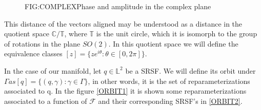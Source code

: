 \begin{figure}[Phase and amplitude in the complex plane]{FIG:COMPLEX}{Phase and amplitude in the complex plane}

 \quad
{}

\end{figure}


This distance of the vectors aligned may be understood as a distance in the
quotient space $\mathbb{C} / \mathbb{T}$, where $\mathbb{T}$ is the unit circle,
which it is isomorph to the group of rotations in the plane $SO(2)$. In this
quotient space we will define the equivalence classes
$[z] = \{z e^{i \theta} : \theta \in [0, 2\pi]\}$.

In the case of our manifold, let $q \in \mathbb{L}^2$ be a SRSF. We will define
its orbit under $\Gamma as [q] = \{(q, \gamma) : \gamma \in \Gamma \}$, in
other words, it is the set of reparameterizations associated to q. In the
figure \ref{ORBIT1} it is shown some reparameterizations associated  to a function
of $\mathscr{F}$ and their corresponding SRSF's in \ref{ORBIT2}.


